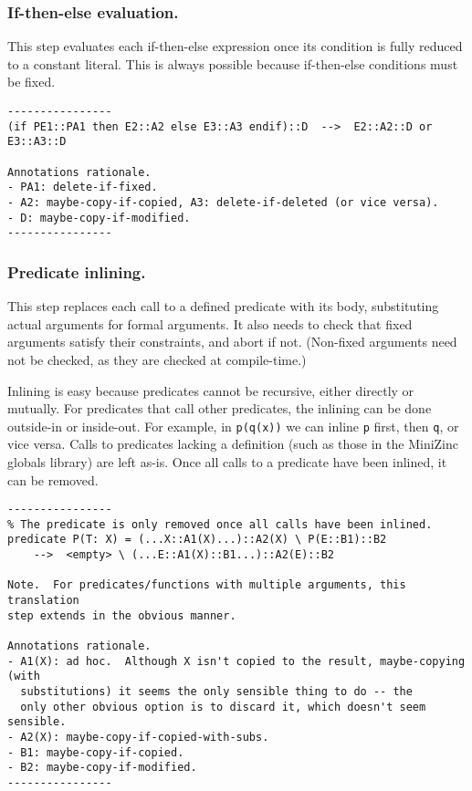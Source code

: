 \documentclass[10pt]{article}
\begin{document}
\subsubsection{If-then-else evaluation.}
This step evaluates each if-then-else expression once its condition is fully
reduced to a constant literal.  This is always possible because if-then-else
conditions must be fixed.

\begin{verbatim}
----------------
(if PE1::PA1 then E2::A2 else E3::A3 endif)::D  -->  E2::A2::D or E3::A3::D

Annotations rationale.
- PA1: delete-if-fixed.
- A2: maybe-copy-if-copied, A3: delete-if-deleted (or vice versa).
- D: maybe-copy-if-modified.
----------------
\end{verbatim}


\subsubsection{Predicate inlining.}
This step replaces each call to a defined predicate with its body,
substituting actual arguments for formal arguments.  It also needs to check
that fixed arguments satisfy their constraints, and abort if not.  (Non-fixed
arguments need not be checked, as they are checked at compile-time.)

Inlining is easy because predicates cannot be recursive, either directly or
mutually.  For predicates that call other predicates, the inlining can be
done outside-in or inside-out.  For example, in \texttt{p(q(x))} we can
inline \texttt{p} first, then \texttt{q}, or vice versa.  Calls to
predicates lacking a definition (such as those in the MiniZinc globals
library) are left as-is.  Once all calls to a predicate have been inlined,
it can be removed.

\begin{verbatim}
----------------
% The predicate is only removed once all calls have been inlined.
predicate P(T: X) = (...X::A1(X)...)::A2(X) \ P(E::B1)::B2
    -->  <empty> \ (...E::A1(X)::B1...)::A2(E)::B2

Note.  For predicates/functions with multiple arguments, this translation
step extends in the obvious manner.

Annotations rationale.
- A1(X): ad hoc.  Although X isn't copied to the result, maybe-copying (with
  substitutions) it seems the only sensible thing to do -- the
  only other obvious option is to discard it, which doesn't seem sensible.
- A2(X): maybe-copy-if-copied-with-subs.
- B1: maybe-copy-if-copied.
- B2: maybe-copy-if-modified.
----------------
\end{verbatim}
\end{document}
